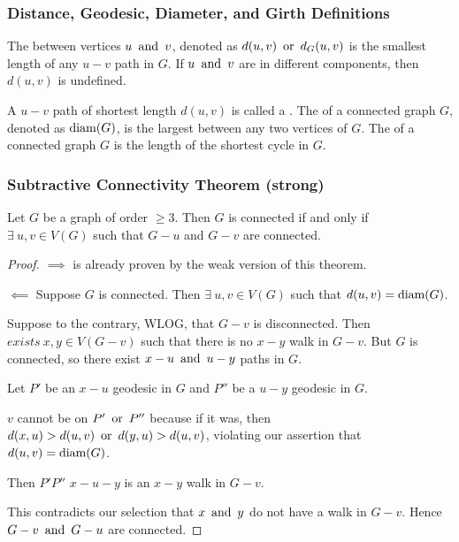 \subsubsection*{Distance, Geodesic, Diameter, and Girth Definitions}
The  between vertices $u \operatorname{~\text{and}~} v$, denoted as $d(u,v) \operatorname{~\text{or}~} d_G(u,v)$ is the smallest length of any $u-v$ path in $G$. If $u \operatorname{~\text{and}~} v$ are in different components, then $d(u,v)$ is undefined.

A $u-v$ path of shortest length $d(u,v)$ is called a . The  of a connected graph $G$, denoted as $\operatorname{\text{diam}}(G)$, is the largest  between any two vertices of $G$. The  of a connected graph $G$ is the length of the shortest cycle in $G$.

\subsubsection*{Subtractive Connectivity Theorem (strong)}
Let $G$ be a graph of order $\geq 3$. Then $G$ is connected if and only if $\exists~ u,v \in V(G)$ such that $G-u$ and $G-v$ are connected.
\begin{proof}
    $\implies$ is already proven by the weak version of this theorem.

    $\impliedby$ Suppose $G$ is connected. Then $\exists~ u,v \in V(G)$ such that $d(u,v) = \operatorname{\text{diam}}(G)$.

    Suppose to the contrary, WLOG, that $G-v$ is disconnected. Then $exists~x,y \in V(G-v)$ such that there is no $x-y$ walk  in $G-v$. But $G$ is connected, so there exist $x-u \operatorname{~\text{and}~} u-y$ paths in $G$.

    Let $P'$ be an $x-u$ geodesic in $G$ and $P''$ be a $u-y$ geodesic in $G$.

    $v$ cannot be on $P' \operatorname{~\text{or}~} P''$ because if it was, then $d(x,u) > d(u,v) \operatorname{~\text{or}~} d(y,u) > d(u,v)$, violating our assertion that $d(u,v) = \operatorname{\text{diam}}(G)$.

    Then $P'P''$ $x-u-y$ is an $x-y$ walk in $G-v$.

    This contradicts our selection that $x \operatorname{~\text{and}~} y$ do not have a walk in $G-v$. Hence $G-v \operatorname{~\text{and}~} G-u$ are connected.
\end{proof}

